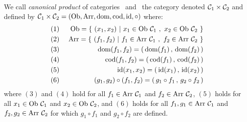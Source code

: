\begin{defin}\label{Cat:def:canonical:product}
    We call {\em canonical product} of categories \Cone\ and \Ctwo\ the category 
    denoted $\mbox{${\cal C}_{1}$}\times\mbox{${\cal C}_{2}$}$ and defined by $\mbox{${\cal C}_{1}$}\times\mbox{${\cal C}_{2}$}=
    (\mbox{\rm Ob}, \mbox{\rm Arr}, \mbox{\rm dom}, \mbox{\rm cod}, \mbox{\rm id}, \circ)$ where:
        \begin{eqnarray*}
            (1)&\ &\ob=\{\ (x_{1},x_{2})\ |\ x_{1}\in\ob\ \Cone\ 
                                          ,\ x_{2}\in\ob\ \Ctwo\ \}\\
            (2)&\ &\arr=\{\ (f_{1},f_{2})\ |\ f_{1}\in\arr\ \Cone\ 
                                           ,\ f_{2}\in\arr\ \Ctwo\ \}\\
            (3)&\ &\dom(f_{1},f_{2})=(\,\dom(f_{1})\,,\,\dom(f_{2})\,)\\
            (4)&\ &\cod(f_{1},f_{2})=(\,\cod(f_{1})\,,\,\cod(f_{2})\,)\\
            (5)&\ &\id(x_{1},x_{2}) =(\,\id(x_{1})\,,\,\id(x_{2})\,)\\
            (6)&\ &(g_{1},g_{2})\circ(f_{1},f_{2})=(\,g_{1}\circ f_{1}\,
                                                   ,\,g_{2}\circ f_{2}\,)
        \end{eqnarray*}
    where $(3)$ and $(4)$ hold for all $f_{1}\in\mbox{\rm Arr}\ \mbox{${\cal C}_{1}$}$ and $f_{2}
    \in\mbox{\rm Arr}\ \mbox{${\cal C}_{2}$}$, $(5)$ holds for all $x_{1}\in\mbox{\rm Ob}\ \mbox{${\cal C}_{1}$}$ and $x_{2}
    \in\mbox{\rm Ob}\ \mbox{${\cal C}_{2}$}$, and $(6)$ holds for all $f_{1},g_{1}\in\arr\ \Cone$
    and $f_{2},g_{2}\in\arr\ \Ctwo$ for which $g_{1}\circ f_{1}$ and
    $g_{2}\circ f_{2}$ are defined.
\end{defin}
